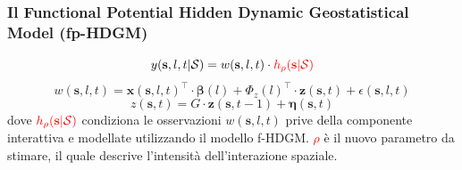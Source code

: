 \begin{frame}
	\frametitle{Il Functional Potential Hidden Dynamic Geostatistical Model (fp-HDGM)}
	\centering
	\begin{equation*}
		y(\mathbf{s}, l, t|\mathcal{S}) = w(\mathbf{s}, l, t)\cdot\textcolor{red}{h_\rho(\mathbf{s}|\mathcal{S})}
	\end{equation*}
	\begin{equation*}
		w(\mathbf{s}, l, t) = \mathbf{x}(\mathbf{s}, l, t)^\top\cdot\boldsymbol{\beta}(l) + \Phi_z(l)^\top\cdot \mathbf{z}(\mathbf{s}, t) + \epsilon(\mathbf{s}, l, t)
	\end{equation*}
	\begin{equation*}
		z(\mathbf{s}, t) = G\cdot\mathbf{z}(\mathbf{s}, t-1) + \boldsymbol{\eta}(\mathbf{s}, t)
	\end{equation*}
	\newline
	\justifying
	dove $\textcolor{red}{h_\rho(\mathbf{s}|\mathcal{S})}$ condiziona le osservazioni $w(\mathbf{s}, l, t)$ prive della componente interattiva e modellate utilizzando il modello f-HDGM. \textcolor{red}{$\rho$} è il nuovo parametro da stimare, il quale descrive l'intensità dell'interazione spaziale.
\end{frame}

